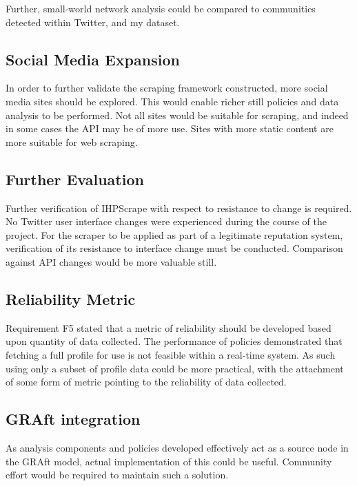 Further, small-world network analysis could be compared to communities detected within Twitter, and my dataset. 

\subsection{Social Media Expansion}

In order to further validate the scraping framework constructed, more social media sites should be explored. This would enable richer still policies and data analysis to be performed. Not all sites would be suitable for scraping, and indeed in some cases the API may be of more use. Sites with more static content are more suitable for web scraping. 




\subsection{Further Evaluation}

Further verification of IHPScrape with respect to resistance to change is required. No Twitter user interface changes were experienced during the course of the project. For the scraper to be applied as part of a legitimate reputation system, verification of its resistance to interface change must be conducted. Comparison against API changes would be more valuable still.

\subsection{Reliability Metric}

Requirement F5 stated that a metric of reliability should be developed based upon quantity of data collected. The performance of policies demonstrated that fetching a full profile for use is not feasible within a real-time system. As such using only a subset of profile data could be more practical, with the attachment of some form of metric pointing to the reliability of data collected.

\subsection{GRAft integration}

As analysis components and policies developed effectively act as a source node in the GRAft model, actual implementation of this could be useful. Community effort would be required to maintain such a solution.
